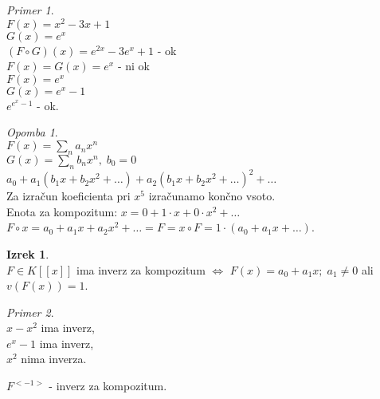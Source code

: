 \documentclass[a4paper, 12pt]{book}
\theoremstyle{definition}
\newtheorem{theorem}[counter]{Izrek}
\theoremstyle{remark}
\newtheorem*{ex}{Primer}
\newtheorem*{rem}{Opomba}
\begin{document}
\begin{ex} \text{} \\
  $F(x) = x^2 - 3x + 1$ \\
  $G(x) = e^x$ \\
  $(F \circ G)(x) = e^{2x} - 3e^x + 1$ - ok \\
  $F(x) = G(x) = e^x$ - ni ok \\
  $F(x) = e^x$ \\
  $G(x) = e^x - 1$ \\
  $e^{e^x-1}$ - ok.
\end{ex}
\begin{rem} \text{} \\
  $F(x) = \sum_n a_n x^n$ \\
  $G(x) = \sum_n b_n x^n, \; b_0 = 0$ \\
  $a_0 + a_1(b_1 x + b_2 x^2 + \dots) + a_2(b_1 x + b_2 x^2 + \dots)^2 + \dots$ \\
  Za izračun koeficienta pri $x^5$ izračunamo končno vsoto. \\
  Enota za kompozitum: $x = 0 + 1 \cdot x + 0 \cdot x^2 + \dots$ \\
  $F \circ x = a_0 + a_1 x + a_2 x^2 + \dots = F = x \circ F = 1 \cdot (a_0 + a_1 x + \dots)$.
\end{rem}
\begin{theorem} \text{} \\
  $F \in K[[x]]$ ima inverz za kompozitum $\iff$ $F(x) = a_0 + a_1 x; \; a_1 \neq 0$ ali $v(F(x)) = 1$.
\end{theorem}
\begin{ex} \text{} \\
  $x - x^2$ ima inverz, \\
  $e^x - 1$ ima inverz, \\
  $x^2$ nima inverza.
\end{ex}
$F^{<-1>}$ - inverz za kompozitum.
\end{document}
